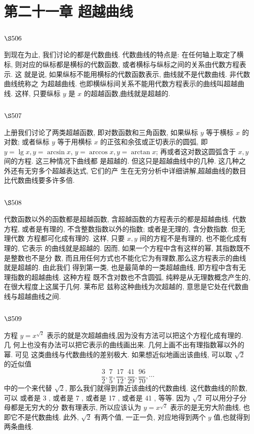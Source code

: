 \chapter{第二十一章 超越曲线}

\section{$\S 506$}

到现在为止, 我们讨论的都是代数曲线. 代数曲线的特点是: 在任何轴上取定了横 标, 则对应的纵标都是横标的代数函数, 或者横标与纵标之间的关系由代数方程表示. 这 就是说, 如果纵标不能用横标的代数函数表示, 曲线就不是代数曲线. 非代数曲线统称之 为超越曲线. 也即横纵标间关系不能用代数方程表示的曲线叫超越曲线. 这样, 只要纵标 $y$ 是 $x$ 的超越函数,曲线就是超越的.

\section{$\S 507$}

上册我们讨论了两类超越函数, 即对数函数和三角函数, 如果纵标 $y$ 等于横标 $x$ 的 对数; 或者纵标 $y$ 等于用横标 $x$ 的正弦和余弦或正切表示的圆弧, 即 $y=\lg x, y=\arcsin x$, $y=\arccos x, y=\arctan x$; 再或者这对数这圆弧含于 $x, y$ 间的方程. 这三种情况下曲线都 是超越的. 但这只是超越曲线中的几种. 这几种之外还有无穷多个超越表达式, 它们的产 生在无穷分析中详细讲解,超越曲线的数目比代数曲线要多许多倍.

\section{$\S 508$}

代数函数以外的函数都是超越函数, 含超越函数的方程表示的都是超越曲线. 代数 方程, 或者是有理的, 不含整数指数以外的指数; 或者是无理的, 含分数指数. 但无理代数 方程都可化成有理的. 这样, 只要 $x, y$ 间的方程不是有理的, 也不能化成有理的, 它表示 的曲线就是超越的. 因而, 如果一个方程中含有这样的幂, 其指数既不是整数也不是分 数, 而且用任何方式也不能化它为有理数,那么这方程表示的曲线就是超越的. 由此我们 得到第一类, 也是最简单的一类超越曲线, 即方程中含有无理指数的超越曲线. 这种方程 既不含对数也不含圆弧, 纯粹是从无理数概念产生的, 在很大程度上这属于几何. 莱布尼 兹称这种曲线为次超越的, 意思是它处在代数曲线与超越曲线之间.

\section{$\S 509$}

方程 $y=x^{\sqrt{2}}$ 表示的就是次超越曲线,因为没有方法可以把这个方程化成有理的. 几 何上也没有办法可以把它表示的曲线画出来. 几何上画不出有理指数幂以外的幂. 可见 这类曲线与代数曲线的差别极大. 如果想近似地画出该曲线, 可以取 $\sqrt{2}$ 的近似值
\[
\frac{3}{2}, \frac{7}{5}, \frac{17}{12}, \frac{41}{29}, \frac{96}{70}, \cdots
\]
中的一个来代替 $\sqrt{2}$, 那么我们就得到靠近该曲线的代数曲线. 这代数曲线的阶数, 可以 或者是 3 , 或者是 7 , 或者是 17 , 或者是 41 , 等等. 因为 $\sqrt{2}$ 可以用分子分母都是无穷大的分 数有理表示, 所以应该认为 $y=x^{\sqrt{2}}$ 表示的是无穷大阶曲线, 也即它不是代数曲线. 此外, $\sqrt{2}$ 有两个值, 一正一负, 对应地得到两个 $y$ 值,也就得到两条曲线.

